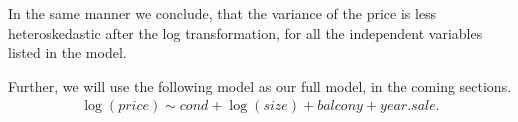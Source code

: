 In the same manner we conclude, that the variance of the price is less heteroskedastic after the log transformation, for all the independent variables listed in the model.

Further, we will use the following model as our full model, in the coming sections.
\begin{align*}
    \log(price) \sim \textit{cond} + \log(size)  + \textit{balcony} + year.sale.
\end{align*}

